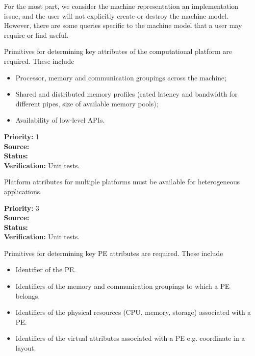 

For the most part, we consider the machine representation an implementation issue,
and the user will not explicitly create or destroy the machine model.
However, there are some queries specific to the machine model that a user may 
require or find useful.


Primitives for determining key attributes of the computational
platform are required.
These include
\begin{itemize}
\item Processor, memory and communication groupings across the machine;
\item Shared and distributed memory profiles (rated latency and
  bandwidth for different pipes, size of available memory pools);
\item Availability of low-level APIs.
\end{itemize}

\begin{reqlist}
{\bf Priority:} 1 \\
{\bf Source:}  \\
{\bf Status:}  \\
{\bf Verification:} Unit tests. \\
\end{reqlist}


Platform attributes for multiple platforms must be available for
heterogeneous applications.

\begin{reqlist}
{\bf Priority:} 3 \\
{\bf Source:}  \\
{\bf Status:}  \\
{\bf Verification:} Unit tests. \\
\end{reqlist}


Primitives for determining key PE attributes are required.
These include
\begin{itemize}
\item Identifier of the PE.
\item Identifiers of the memory and communication groupings to which a 
PE belongs.
\item Identifiers of the physical resources (CPU, memory, storage) associated with a PE.
\item Identifiers of the virtual attributes associated with a PE e.g. coordinate in a layout.
\end{itemize}

